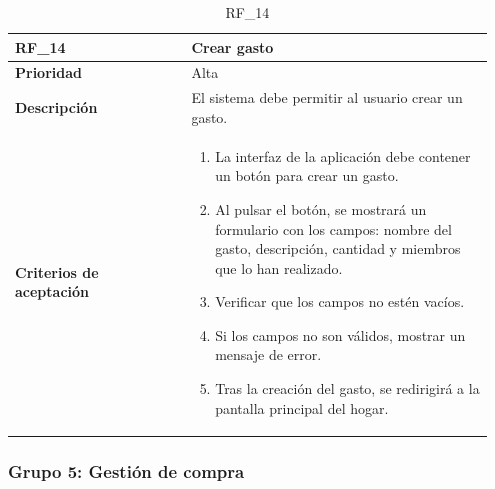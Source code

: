 \begin{table}[htb!]
    \begin{tabular}{|p{0.35\linewidth}|p{0.6\linewidth}|}
        \hline
        \rowcolor[HTML]{C0C0C0}  
        \textbf{RF\_14} & \textbf{Crear gasto} \\
        \hline
        \textbf{Prioridad} & Alta \\
        \hline
        \textbf{Descripción} & El sistema debe permitir al usuario crear un gasto.  \\
        \hline
        \vspace{0.5mm}
        \textbf{Criterios de aceptación} & 
        \begin{minipage}[t]{0.9\linewidth}
            \begin{enumerate}
                \item La interfaz de la aplicación debe contener un botón para crear un gasto.
                \item Al pulsar el botón, se mostrará un formulario con los campos: nombre del gasto, descripción, cantidad y miembros que lo han realizado.
                \item Verificar que los campos no estén vacíos.
                \item Si los campos no son válidos, mostrar un mensaje de error.
                \item Tras la creación del gasto, se redirigirá a la pantalla principal del hogar.
            \end{enumerate}
            \vspace{2mm}
        \end{minipage} \\
        \hline
    \end{tabular}
    \caption{RF\_14}

\end{table}



\clearpage

\subsubsection{Grupo 5: Gestión de compra}
\label{subsubsec:grupo5}













